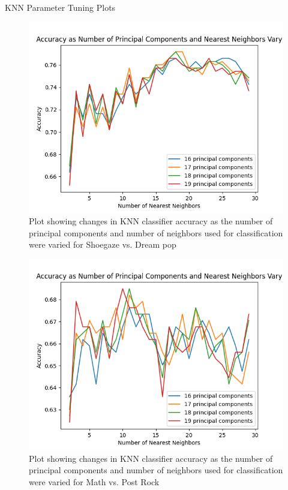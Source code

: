 \documentclass[letterpaper, 12 pt, conference]{ieeeconf}  %
\begin{document}
\par KNN Parameter Tuning Plots
\begin{figure}[H]
    \centering
    \includegraphics[width=.8\linewidth]{knnplot_dpsg.png}
    \caption{Plot showing changes in KNN classifier accuracy as the number of principal components and number of neighbors used for classification were varied for Shoegaze vs. Dream pop}
    \label{fig:knngraph1}
\end{figure}
\begin{figure}[H]
    \centering
    \includegraphics[width=.8\linewidth]{knnplot_mrpr.png}
    \caption{Plot showing changes in KNN classifier accuracy as the number of principal components and number of neighbors used for classification were varied for Math vs. Post Rock}
    \label{fig:knngraph2}
\end{figure}
\end{document}
